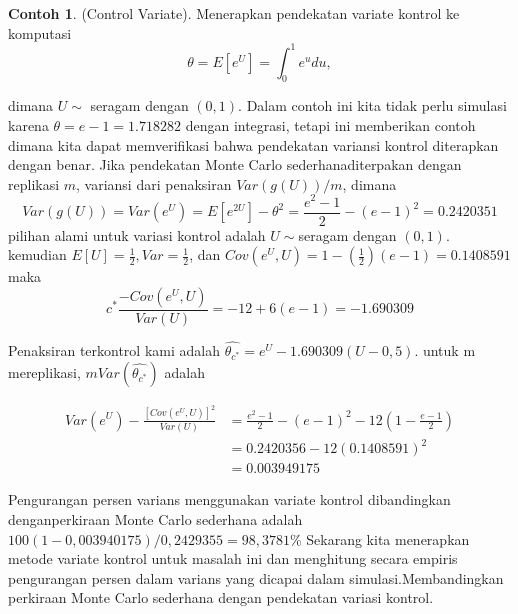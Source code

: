 \documentclass[a4paper,12pt]{article}
\theoremstyle{definition}
\newtheorem{example}{Contoh}[section]
\begin{document}
\begin{example}(Control Variate).
    Menerapkan pendekatan variate kontrol ke komputasi
    \begin{equation*}
        \theta = E\left [ e^{U} \right ]=\int_{0}^{1}e^{u}du,
    \end{equation*}

    dimana $U\sim$ seragam dengan $\left (0,1  \right )$. Dalam contoh ini kita tidak perlu simulasi karena $\theta = e-1=1.718282$ dengan integrasi, tetapi ini memberikan contoh dimana kita dapat memverifikasi bahwa pendekatan variansi kontrol diterapkan dengan benar. Jika pendekatan Monte Carlo sederhanaditerpakan dengan replikasi $m$, variansi dari penaksiran $Var\left ( g\left ( U \right ) \right )/m$, dimana 
    \begin{equation*}
        Var\left ( g\left ( U \right ) \right )=Var\left ( e^{U} \right )=E\left [ e^{2U} \right ]-\theta^{2}=\frac{e^{2}-1}{2}-\left ( e-1 \right )^{2}=0.2420351
    \end{equation*}
    pilihan alami untuk variasi kontrol adalah $U\sim$seragam dengan $\left (0,1  \right )$. kemudian $E\left [ U \right ]=\frac{1}{2},Var=\frac{1}{2}$, dan $Cov\left ( e^{U},U \right )=1-\left ( \frac{1}{2} \right )\left ( e-1 \right )=0.1408591$ maka
    \begin{equation*}
        c^{*}\frac{-Cov\left ( e^{U},U \right )}{Var\left ( U \right )}=-12+6\left ( e-1 \right )=-1.690309
    \end{equation*}
    
    Penaksiran terkontrol kami adalah $\widehat{\theta_{c^{*}}}=e^{U}-1.690309\left (U-0,5  \right )$. untuk m mereplikasi, $mVar\left ( \widehat{\theta_{c^{*}}} \right )$ adalah

    \begin{equation*}
       \begin{split}
            Var\left ( e^{U} \right )-\frac{\left [ Cov\left ( e^{U},U \right ) \right ]^{2}}{Var\left ( U \right )}&=\frac{e^{2}-1}{2}-\left ( e-1 \right )^{2}-12\left ( 1-\frac{e-1}{2} \right )\\
        &=0.2420356-12\left ( 0.1408591 \right )^{2}\\
        &=0.003949175
       \end{split}
    \end{equation*}

    Pengurangan persen varians menggunakan variate kontrol dibandingkan denganperkiraan Monte Carlo sederhana adalah $100(1-0,003940175)/0,2429355 = 98,3781$\% Sekarang kita menerapkan metode variate kontrol untuk masalah ini dan menghitung secara empiris pengurangan persen dalam varians yang dicapai dalam simulasi.Membandingkan perkiraan Monte Carlo sederhana dengan pendekatan variasi kontrol.


\end{example}
\end{document}
